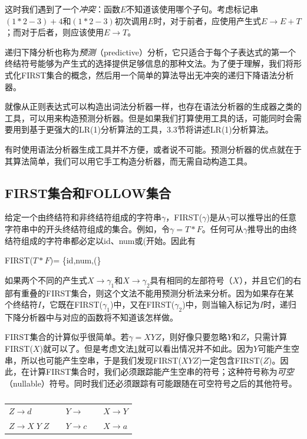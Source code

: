 \documentclass[cn,11pt,chinese]{elegantbook}
\begin{document}
这时我们遇到了一个\textit{冲突}：函数$E$不知道该使用哪个子句。考虑标记串$(1*2-3)+4$和$(1*2-3)$初次调用$E$时，对于前者，应使用产生式$E \rightarrow E+T$；而对于后者，则应该使用$E \rightarrow T$。

递归下降分析也称为\textit{预测}（predictive）分析，它只适合于每个子表达式的第一个终结符号能够为产生式的选择提供足够信息的那种文法。为了便于理解，我们将形式化FIRST集合的概念，然后用一个简单的算法导出无冲突的递归下降语法分析器。

就像从正则表达式可以构造出词法分析器一样，也存在语法分析器的生成器之类的工具，可以用来构造预测分析器。但是如果我们打算使用工具的话，可能同时会需要用到基于更强大的LR(1)分析算法的工具，3.3节将讲述LR(1)分析算法。

有时使用语法分析器生成工具并不方便，或者说不可能。预测分析器的优点就在于其算法简单，我们可以用它手工构造分析器，而无需自动构造工具。

\subsection{FIRST集合和FOLLOW集合}

给定一个由终结符和非终结符组成的字符串$\gamma$，FIRST($\gamma$)是从$\gamma$可以推导出的任意字符串中的开头终结符组成的集合。例如，令$\gamma=T*F$。任何可从$\gamma$推导出的由终结符组成的字符串都必定以id、num或(开始。因此有

FIRST($T*F$)= \{id,num,(\}

如果两个不同的产生式$X\rightarrow \gamma_1$和$X\rightarrow \gamma_2$具有相同的左部符号（$X$），并且它们的右部有重叠的FIRST集合，则这个文法不能用预测分析法来分析。因为如果存在某个终结符$I$，它既在FIRST($\gamma_1$)中，又在FIRST($\gamma_2$)中，则当输入标记为$I$时，递归下降分析器中与对应的函数将不知道该怎样做。

FIRST集合的计算似乎很简单。若$\gamma=XYZ$，则好像只要忽略$Y$和$Z$，只需计算FIRST($X$)就可以了。但是考虑文法\ref{grammar:3-12}就可以看出情况并不如此。因为$Y$可能产生空串，所以也可能产生空串，于是我们发现FIRST($XYZ$)一定包含FIRST($Z$)。因此，在计算FIRST集合时，我们必须跟踪能产生空串的符号；这种符号称为\textit{可空}（nullable）符号。同时我们还必须跟踪有可能跟随在可空符号之后的其他符号。

\renewcommand\tablename{文法}
\begin{table}[htbp]
  \centering
  \begin{tabular}{lllll}
    \toprule
    $Z \rightarrow d$ & \quad & $Y \rightarrow  $ & \quad & $X \rightarrow Y$ \\
    $Z \rightarrow X \; Y \; Z$ & \quad & $Y \rightarrow c$ & \quad & $X \rightarrow a$ \\
    \bottomrule
  \end{tabular}
  \caption{}
  \label{grammar:3-12}
\end{table}
\renewcommand\tablename{表}
\end{document}
